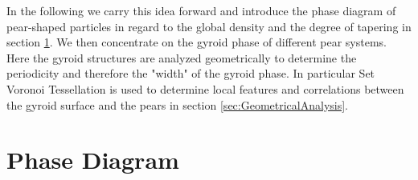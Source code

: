 \documentclass[epj,twocolumn]{webofc}
\begin{document}
In the following we carry this idea forward and introduce the phase diagram of pear-shaped particles in regard to the global density and the degree of tapering in section \ref{sec:PhaseDiagram}. We then concentrate on the gyroid 
phase of different pear systems. Here the gyroid structures are analyzed geometrically to determine the periodicity and therefore the "width" of the gyroid phase. In particular Set Voronoi Tessellation is used to determine local 
features and correlations between the gyroid surface and the pears in section \ref{sec:GeometricalAnalysis}.

%



\section{Phase Diagram}
\label{sec:PhaseDiagram}
\end{document}
